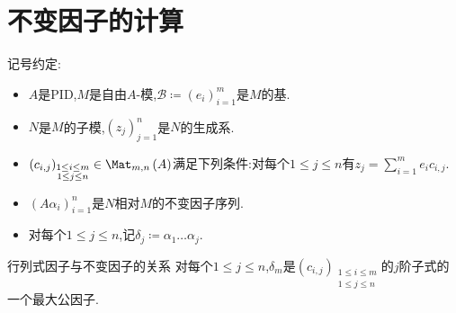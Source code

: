 \section{不变因子的计算}

记号约定:
\begin{itemize}
	\item $A$是PID,$M$是自由$A$-模,$\mathcal{B}\coloneq\left(e_{i}\right)_{i=1}^{m}$是$M$的基.
	\item $N$是$M$的子模,$\left(z_{j}\right)_{j=1}^{n}$是$N$的生成系.
	\item $\left(c_{i,j}\right)_{\substack{1\leq i\leq m\\ 1\leq j\leq n}}\in\Mat_{m,n}\left(A\right)$满足下列条件:对每个$1\leq j\leq n$有$z_{j}=\sum\limits_{i=1}^{m}e_{i}c_{i,j}$.
	\item $\left(A\alpha_{i}\right)_{i=1}^{n}$是$N$相对$M$的不变因子序列.
	\item 对每个$1\leq j\leq n$,记$\delta_{j}\coloneq\alpha_{1}\ldots\alpha_{j}$.
\end{itemize}

\begin{proposition}{行列式因子与不变因子的关系}{}
	对每个$1\leq j\leq n$,$\delta_{m}$是$\left(c_{i,j}\right)_{\substack{1\leq i\leq m\\ 1\leq j\leq n}}$的$j$阶子式的一个最大公因子.
\end{proposition}